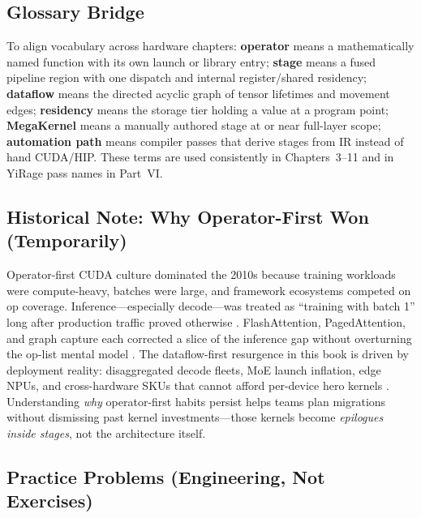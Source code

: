 \subsection{Glossary Bridge}
\label{sec:glossary_bridge}

To align vocabulary across hardware chapters:
\textbf{operator} means a mathematically named function with its own launch or library entry;
\textbf{stage} means a fused pipeline region with one dispatch and internal register/shared residency;
\textbf{dataflow} means the directed acyclic graph of tensor lifetimes and movement edges;
\textbf{residency} means the storage tier holding a value at a program point;
\textbf{MegaKernel} means a manually authored stage at or near full-layer scope;
\textbf{automation path} means compiler passes that derive stages from IR instead of hand CUDA/HIP.
These terms are used consistently in Chapters~3--11 and in YiRage pass names in Part~VI.

\subsection{Historical Note: Why Operator-First Won (Temporarily)}
\label{sec:historical_note}

Operator-first CUDA culture dominated the 2010s because training workloads were compute-heavy, batches were large, and framework ecosystems competed on op coverage.
Inference---especially decode---was treated as ``training with batch 1'' long after production traffic proved otherwise \citep{patel2025llminference}.
FlashAttention, PagedAttention, and graph capture each corrected a slice of the inference gap without overturning the op-list mental model \citep{dao2022flashattention,kwon2023vllm,nvidia2024cudagraphs}.
The dataflow-first resurgence in this book is driven by deployment reality: disaggregated decode fleets, MoE launch inflation, edge NPUs, and cross-hardware SKUs that cannot afford per-device hero kernels \citep{liu2024deepseekv3,taxbreak2026,amd2024xdna}.
Understanding \emph{why} operator-first habits persist helps teams plan migrations without dismissing past kernel investments---those kernels become \emph{epilogues inside stages}, not the architecture itself.

\subsection{Practice Problems (Engineering, Not Exercises)}
\label{sec:practice_problems}

